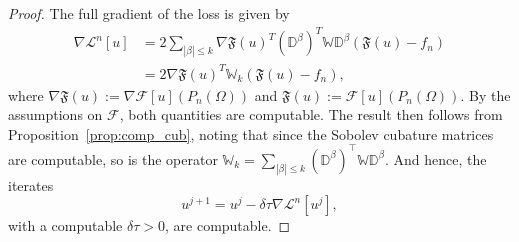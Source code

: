 \documentclass[pdflatex]{sn-jnl}%
\begin{document}
\vspace{-1em}\begin{proof}
    The full gradient of the loss is given by
    \begin{equation}
    \begin{aligned}
        \nabla\mathcal{L}^n[u] &= 2\sum\limits_{|\beta|\leq k}\nabla\mathfrak{F}(u)^T(\mathbb{D^\beta})^T\mathbb{W}\mathbb{D^\beta}(\mathfrak{F}(u)-f_n)\\&
        = 2\nabla\mathfrak{F}(u)^T\mathbb{W}_k(\mathfrak{F}(u)-f_n),
    \end{aligned}
    \end{equation}
    where $\nabla\mathfrak{F}(u):=\nabla\mathcal{F}[u](P_{n}(\Omega))$ and $\mathfrak{F}(u):=\mathcal{F}[u](P_{n}(\Omega))$. By the assumptions on $\mathcal{F}$, both quantities are computable. The result then follows from Proposition~\ref{prop:comp_cub}, noting that since the Sobolev cubature matrices are computable, so is the operator $\mathbb{W}_k = \sum\limits_{|\beta|\leq k}(\mathbb{D}^\beta)^\top \mathbb{W} \mathbb{D}^\beta$. And hence, the iterates 
    $$
   u^{j+1} =u^j-\delta\tau \nabla\mathcal{L}^n[u^{j}],
    $$
    with a computable $\delta\tau>0$, are computable. 
\end{proof}
\end{document}
